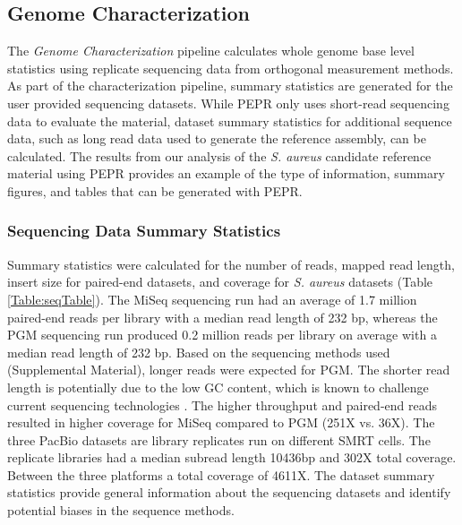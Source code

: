 \documentclass[smallextended]{svjour3}\usepackage[]{graphicx}\usepackage[]{color}
\begin{document}
\subsection{Genome Characterization}
The \textit{Genome Characterization} pipeline calculates whole genome base level statistics using replicate sequencing data from orthogonal measurement methods. 
As part of the characterization pipeline, summary statistics are generated for the user provided sequencing datasets. 
While PEPR only uses short-read sequencing data to evaluate the material, dataset summary statistics for additional sequence data, such as long read data used to generate the reference assembly, can be calculated.  
The results from our analysis of the \textit{S. aureus} candidate reference material using PEPR provides an example of the type of information, summary figures, and tables that can be generated with PEPR.


\subsubsection{Sequencing Data Summary Statistics}
Summary statistics were calculated for the number of reads, mapped read length, insert size for paired-end datasets, and coverage for \textit{S. aureus} datasets (Table \ref{Table:seqTable}). 
The MiSeq sequencing run had an average of 1.7 million paired-end reads per library with a median read length of 232 bp, whereas the PGM sequencing run produced 0.2 million reads per library on average with a median read length of 232 bp. 
Based on the sequencing methods used (Supplemental Material), longer reads were expected for PGM. The shorter read length is potentially due to the low GC content, which is known to challenge current sequencing technologies \cite{Quail2012}.
The higher throughput and paired-end reads resulted in higher coverage for MiSeq compared to PGM (251X vs. 36X). 
The three PacBio datasets are library replicates run on different SMRT cells.
The replicate libraries had a median subread length 10436bp and 302X total coverage. 
Between the three platforms a total coverage of 4611X. 
The dataset summary statistics provide general information about the sequencing datasets and identify potential biases in the sequence methods.
\end{document}
